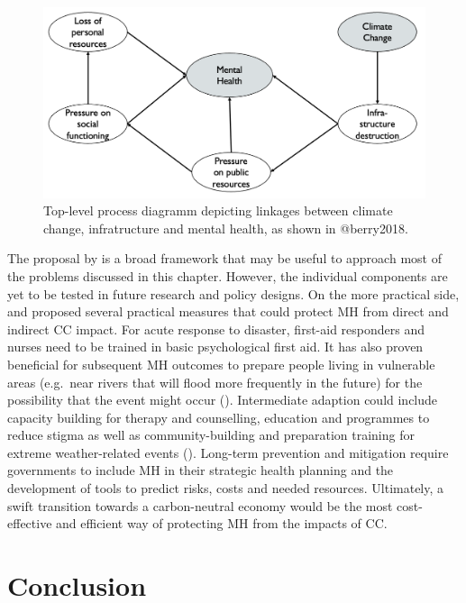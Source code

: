 \documentclass[
]{krantz}
\begin{document}
\begin{figure}

{\centering \includegraphics[width=0.75\linewidth]{work/12-mentalhealth/figures/DAG_infra_2} 

}

\caption{Top-level process diagramm depicting linkages between climate change, infratructure and mental health, as shown in @berry2018.}\label{fig:DAGInfra}
\end{figure}

The proposal by \citet{berry2018} is a broad framework that may be useful to approach most of the problems discussed in this chapter. However, the individual components are yet to be tested in future research and policy designs.
On the more practical side, \citet{hayes2018} and \citet{newnham2020} proposed several practical measures that could protect MH from direct and indirect CC impact. For acute response to disaster, first-aid responders and nurses need to be trained in basic psychological first aid. It has also proven beneficial for subsequent MH outcomes to prepare people living in vulnerable areas (e.g.~near rivers that will flood more frequently in the future) for the possibility that the event might occur (\citet{munro2017}). Intermediate adaption could include capacity building for therapy and counselling, education and programmes to reduce stigma as well as community-building and preparation training for extreme weather-related events (\citet{newnham2020}). Long-term prevention and mitigation require governments to include MH in their strategic health planning and the development of tools to predict risks, costs and needed resources. Ultimately, a swift transition towards a carbon-neutral economy would be the most cost-effective and efficient way of protecting MH from the impacts of CC.

\section{Conclusion}\label{conclusion-6}
\end{document}
